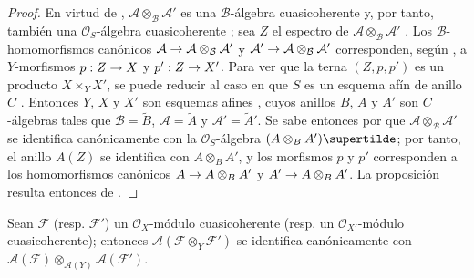 \documentclass[oneside,10pt]{amsart}
\makeatletter
\newcommand{\ega@arrow}[2]{\mathchoice{#1}{#2}{#2}{#2}}
\renewcommand{\to}{\ega@arrow{\longrightarrow}{\rightarrow}}
\let\EGAOriginalLabel\label
\renewcommand{\label}[1]{\phantomsection\EGAOriginalLabel{#1}}
\makeatother
\begin{document}
\begin{proof}
En virtud de , $\mathcal{A}\otimes_{\mathcal{B}}\mathcal{A}'$ es una $\mathcal{B}$-álgebra cuasicoherente y, por tanto, también una $\mathcal{O}_S$-álgebra cuasicoherente ; sea $Z$ el espectro de $\mathcal{A}\otimes_{\mathcal{B}}\mathcal{A}'$ .
Los $\mathcal{B}$-homomorfismos canónicos $\mathcal{A}\to\mathcal{A}\otimes_{\mathcal{B}}\mathcal{A}'$ y $\mathcal{A}'\to\mathcal{A}\otimes_{\mathcal{B}}\mathcal{A}'$ corresponden, según , a $Y$-morfismos $p:Z\to X$ y $p':Z\to X'$.
Para ver que la terna $(Z,p,p')$ es un producto $X\times_Y X'$, se puede reducir al caso en que $S$ es un esquema afín de anillo $C$ .
Entonces $Y$, $X$ y $X'$ son esquemas afines , cuyos anillos $B$, $A$ y $A'$ son $C$-álgebras tales que $\mathcal{B}=\widetilde{B}$, $\mathcal{A}=\widetilde{A}$ y $\mathcal{A}'=\widetilde{A}'$.
Se sabe entonces por  que $\mathcal{A}\otimes_{\mathcal{B}}\mathcal{A}'$ se identifica canónicamente con la $\mathcal{O}_S$-álgebra $(A\otimes_B A')\supertilde$; por tanto, el anillo $A(Z)$ se identifica con $A\otimes_B A'$, y los morfismos $p$ y $p'$ corresponden a los homomorfismos canónicos $A\to A\otimes_B A'$ y $A'\to A\otimes_B A'$.
La proposición resulta entonces de .
\end{proof}

\begin{corollary}[1.4.7]
\label{II.1.4.7-fr}
Sean $\mathcal{F}$ \textup{(resp. $\mathcal{F}'$)} un $\mathcal{O}_X$-módulo cuasicoherente \textup{(resp.} un $\mathcal{O}_{X'}$-módulo cuasicoherente); entonces $\mathcal{A}(\mathcal{F}\otimes_Y\mathcal{F}')$ se identifica canónicamente con $\mathcal{A}(\mathcal{F})\otimes_{\mathcal{A}(Y)}
\mathcal{A}(\mathcal{F}')$.
\end{corollary}
\end{document}
